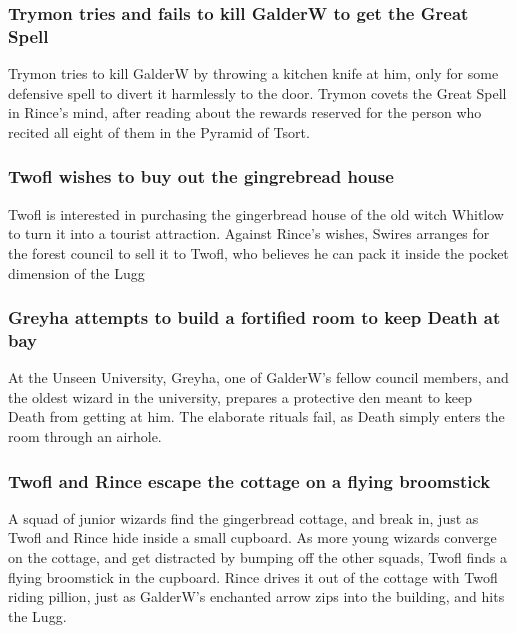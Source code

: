 \subsubsection{\Gls{Trymon} tries and fails to kill \Gls{GalderW} to get the Great Spell}
\Gls{Trymon} tries to kill \Gls{GalderW} by throwing a kitchen knife at him, only for some defensive
spell to divert it harmlessly to the door. \Gls{Trymon} covets the Great Spell in \Gls{Rince}'s
mind, after reading about the rewards reserved for the person who recited all eight of them in the
Pyramid of Tsort.

\subsubsection{\Gls{Twofl} wishes to buy out the gingrebread house}
\Gls{Twofl} is interested in purchasing the gingerbread house of the old witch \Gls{Whitlow} to
turn it into a tourist attraction. Against \Gls{Rince}'s wishes, \Gls{Swires} arranges for the
forest council to sell it to \Gls{Twofl}, who believes he can pack it inside the pocket dimension
of the \Gls{Lugg}

\subsubsection{\Gls{Greyha} attempts to build a fortified room to keep \Gls{Death} at bay}
At the Unseen University, \Gls{Greyha}, one of \Gls{GalderW}'s fellow council members, and the
oldest wizard in the university, prepares a protective den meant to keep \Gls{Death} from getting
at him. The elaborate rituals fail, as \Gls{Death} simply enters the room through an airhole.

\subsubsection{\Gls{Twofl} and \Gls{Rince} escape the cottage on a flying broomstick}
A squad of junior wizards find the gingerbread cottage, and break in, just as \Gls{Twofl} and
\Gls{Rince} hide inside a small cupboard. As more young wizards converge on the cottage, and
get distracted by bumping off the other squads, \Gls{Twofl} finds a flying broomstick in the
cupboard. \Gls{Rince} drives it out of the cottage with \Gls{Twofl} riding pillion, just as
\Gls{GalderW}'s enchanted arrow zips into the building, and hits the \Gls{Lugg}.

\subsection{}
